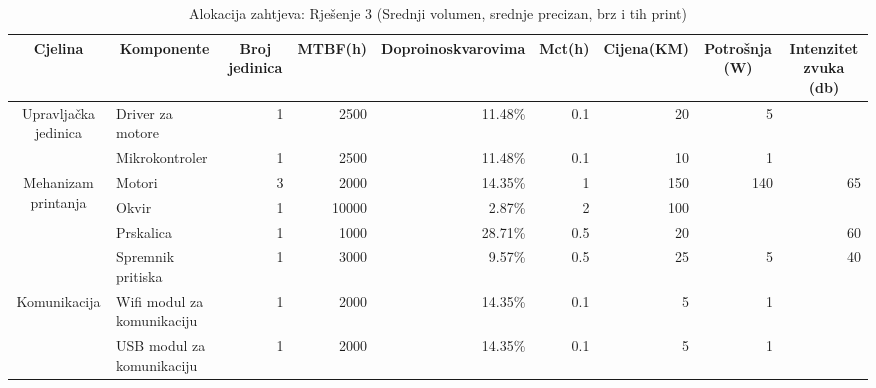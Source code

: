 \documentclass[12pt]{article}
\begin{document}
\begin{landscape}
\begin{table}[htbp]
  \centering
  \scriptsize
  \caption{Alokacija zahtjeva: Rješenje 3 (Srednji volumen, srednje precizan, brz i tih print)}
    \begin{tabular}{ccccccccc}
    \toprule
    Cjelina & Komponente & Broj jedinica & MTBF(h) & \multicolumn{1}{p{5.215em}}{Doproinos\newline{}kvarovima} & Mct(h) & Cijena(KM) & Potrošnja (W) & Intenzitet zvuka (db) \\
    \midrule
    \multirow{2}[4]{*}{Upravljačka jedinica} & \multicolumn{1}{l}{Driver za motore} & \multicolumn{1}{r}{1} & \multicolumn{1}{r}{2500} & \multicolumn{1}{r}{11.48\%} & \multicolumn{1}{r}{0.1} & \multicolumn{1}{r}{20} & \multicolumn{1}{r}{5} &  \\
\cmidrule{5-5}          & \multicolumn{1}{l}{Mikrokontroler} & \multicolumn{1}{r}{1} & \multicolumn{1}{r}{2500} & \multicolumn{1}{r}{11.48\%} & \multicolumn{1}{r}{0.1} & \multicolumn{1}{r}{10} & \multicolumn{1}{r}{1} &  \\
    \midrule
    \multirow{4}[8]{*}{Mehanizam printanja} & \multicolumn{1}{l}{Motori} & \multicolumn{1}{r}{3} & \multicolumn{1}{r}{2000} & \multicolumn{1}{r}{14.35\%} & \multicolumn{1}{r}{1} & \multicolumn{1}{r}{150} & \multicolumn{1}{r}{140} & \multicolumn{1}{r}{65} \\
\cmidrule{5-5}          & \multicolumn{1}{l}{Okvir} & \multicolumn{1}{r}{1} & \multicolumn{1}{r}{10000} & \multicolumn{1}{r}{2.87\%} & \multicolumn{1}{r}{2} & \multicolumn{1}{r}{100} & \multicolumn{1}{l}{  } &  \\
\cmidrule{5-5}          & \multicolumn{1}{l}{Prskalica} & \multicolumn{1}{r}{1} & \multicolumn{1}{r}{1000} & \multicolumn{1}{r}{28.71\%} & \multicolumn{1}{r}{0.5} & \multicolumn{1}{r}{20} &       & \multicolumn{1}{r}{60} \\
\cmidrule{5-5}          & \multicolumn{1}{l}{Spremnik pritiska} & \multicolumn{1}{r}{1} & \multicolumn{1}{r}{3000} & \multicolumn{1}{r}{9.57\%} & \multicolumn{1}{r}{0.5} & \multicolumn{1}{r}{25} & \multicolumn{1}{r}{5} & \multicolumn{1}{r}{40} \\
    \midrule
    \multirow{2}[4]{*}{Komunikacija} & \multicolumn{1}{l}{Wifi modul za komunikaciju} & \multicolumn{1}{r}{1} & \multicolumn{1}{r}{2000} & \multicolumn{1}{r}{14.35\%} & \multicolumn{1}{r}{0.1} & \multicolumn{1}{r}{5} & \multicolumn{1}{r}{1} &  \\
\cmidrule{5-5}          & \multicolumn{1}{l}{USB modul za komunikaciju} & \multicolumn{1}{r}{1} & \multicolumn{1}{r}{2000} & \multicolumn{1}{r}{14.35\%} & \multicolumn{1}{r}{0.1} & \multicolumn{1}{r}{5} & \multicolumn{1}{r}{1} &  \\

\end{tabular}
\end{table}
\end{landscape}
\end{document}
